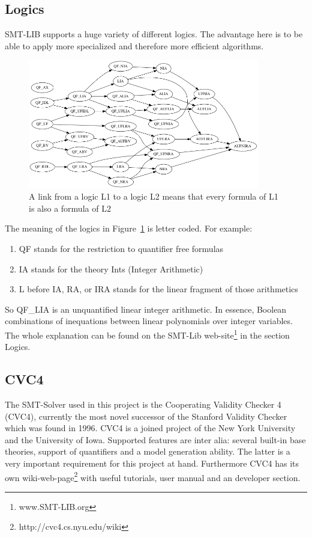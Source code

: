 \documentclass[a4paper,10pt]{paper}
\begin{document}
\subsection{Logics}
SMT-LIB supports a huge variety of different logics. The advantage here is to be able to apply more specialized and therefore more efficient algorithms.
\begin{figure}
  \centering
  \includegraphics[width=0.9\textwidth]{Pictures/logics.png}  
  \caption{A link from a logic L1 to a logic L2 means that every formula of L1 is also a formula of L2}
  \label{fig:logics}
\end{figure}
The meaning of the logics in Figure~\ref{fig:logics} is letter coded. For example:
\begin{enumerate}
  \item QF stands for the restriction to quantifier free formulas
  \item IA stands for the theory Ints (Integer Arithmetic)
  \item L before IA, RA, or IRA stands for the linear fragment of those arithmetics 
\end{enumerate}
So QF\_LIA is an unquantified linear integer arithmetic. In essence, Boolean combinations of inequations between linear polynomials over integer variables.
The whole explanation can be found on the SMT-Lib web-site\footnote{www.SMT-LIB.org} in the section Logics.

\subsection{CVC4}
The SMT-Solver used in this project is the Cooperating Validity Checker 4 (CVC4), currently the most novel  successor of the Stanford Validity Checker which was found in 1996. CVC4 is a joined project of the New York University and the University of Iowa.
Supported features are inter alia: several built-in base theories, support of quantifiers and a model generation ability. The latter is a very important requirement for this project at hand.
Furthermore CVC4 has its own wiki-web-page\footnote{http://cvc4.cs.nyu.edu/wiki} with useful tutorials, user manual and an developer section.
\end{document}
